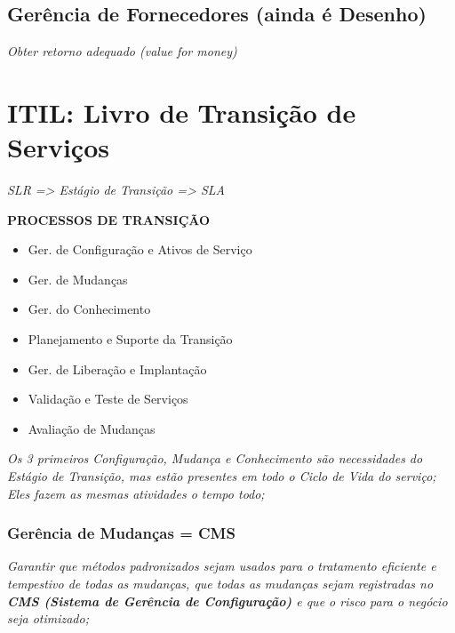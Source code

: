 \subsection{Gerência de Fornecedores (ainda é Desenho)}

\begin{center}
	\emph{Obter retorno adequado (value for money)}
\end{center}


\section{ITIL: Livro de Transição de Serviços}

\begin{center}
	\emph{SLR => Estágio de Transição => SLA}
\end{center}


\textbf{PROCESSOS DE TRANSIÇÃO}
\begin{itemize}
	\item Ger. de Configuração e Ativos de Serviço
	\item Ger. de Mudanças
	\item Ger. do Conhecimento
	\item Planejamento e Suporte da Transição
	\item Ger. de Liberação e Implantação
	\item Validação e Teste de Serviços
	\item Avaliação de Mudanças
\end{itemize}

	\begin{center}
		\emph{Os 3 primeiros Configuração, Mudança e Conhecimento são necessidades do Estágio de Transição, mas estão presentes em todo o Ciclo de Vida do serviço; Eles fazem as mesmas atividades o tempo todo;}
	\end{center}

\subsubsection{Gerência de Mudanças = CMS}

	\begin{center}
		\emph{Garantir que métodos padronizados sejam usados para o tratamento eficiente e tempestivo de todas as mudanças, que todas as mudanças sejam registradas no \textbf{CMS (Sistema de Gerência de Configuração)} e que o risco para o negócio seja otimizado;}
	\end{center}

